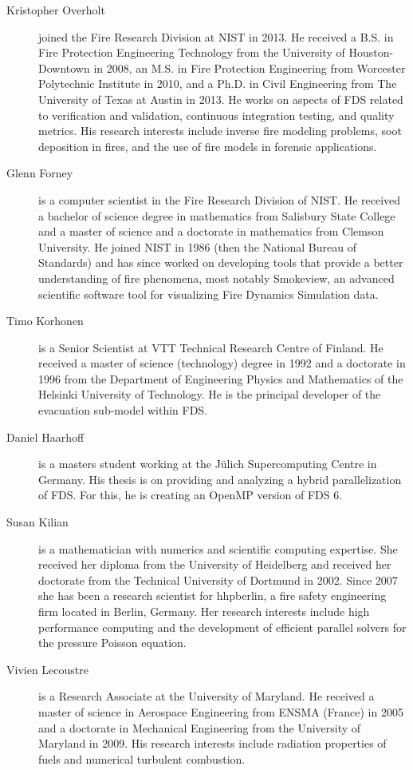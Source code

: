\begin{description}
\item[Kristopher Overholt] joined the Fire Research Division at NIST in 2013. He received a B.S. in Fire Protection Engineering Technology from the University of Houston-Downtown in 2008, an M.S. in Fire Protection Engineering from Worcester Polytechnic Institute in 2010, and a Ph.D. in Civil Engineering from The University of Texas at Austin in 2013. He works on aspects of FDS related to verification and validation, continuous integration testing, and quality metrics. His research interests include inverse fire modeling problems, soot deposition in fires, and the use of fire models in forensic applications.

\item[Glenn Forney] is a computer scientist in the Fire Research Division of NIST.  He received a bachelor of science degree in mathematics from Salisbury State College and a master of science and a doctorate in mathematics from Clemson University.  He joined NIST in 1986 (then the National Bureau of Standards) and has since worked on developing tools that provide a better understanding of fire phenomena, most notably Smokeview, an advanced scientific software tool for visualizing Fire Dynamics Simulation data.

\item[Timo Korhonen] is a Senior Scientist at VTT Technical Research Centre of Finland. He received a master of science (technology) degree in 1992 and a doctorate in 1996 from the Department of Engineering Physics and Mathematics of the Helsinki University of Technology. He is the principal developer of the evacuation sub-model within FDS.

\item[Daniel Haarhoff] is a masters student working at the J\"ulich Supercomputing Centre in Germany. His thesis is on providing and analyzing a hybrid parallelization of FDS. For this, he is creating an OpenMP version of FDS 6.

\item[Susan Kilian] is a mathematician with numerics and scientific computing expertise. She received her diploma from the University of Heidelberg and received her doctorate from the Technical University of Dortmund in 2002. Since 2007 she has been a research scientist for hhpberlin, a fire safety engineering firm located in Berlin, Germany. Her research interests include high performance computing and the development of efficient parallel solvers for the pressure Poisson equation.

\item[Vivien Lecoustre] is a Research Associate at the University of Maryland. He received a master of science in Aerospace Engineering from ENSMA (France) in 2005 and a doctorate in Mechanical Engineering from the University of Maryland in 2009. His research interests include radiation properties of fuels and numerical turbulent combustion.


\end{description}
